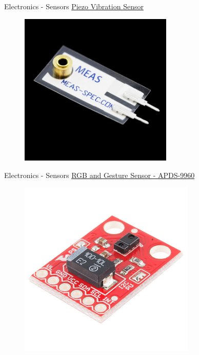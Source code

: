\documentclass{beamer}
\begin{document}
\begin{frame}{Electronics - Sensors}
    \href{https://www.sparkfun.com/products/9197}{Piezo Vibration Sensor}
    \begin{figure}[h]
        \includegraphics[width=0.65\textwidth]{piezovibration.jpg}
    \end{figure}
\end{frame}

\begin{frame}{Electronics - Sensors}
    \href{https://www.sparkfun.com/products/12787}{RGB and Gesture Sensor - APDS-9960}
    \begin{figure}[h]
        \includegraphics[width=0.75\textwidth]{rgb.jpg}
    \end{figure}
\end{frame}
\end{document}

